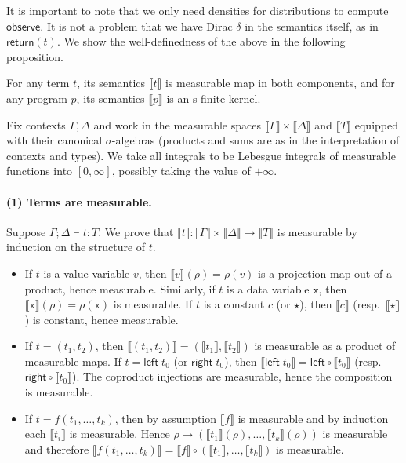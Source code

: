 \documentclass[preprint]{uai2026} %
\newcommand{\sem}[1]{\llbracket #1 \rrbracket}
\newcommand{\return}[1]{\mathsf{return}(#1)}
\newcommand{\datavar}[1]{\mathtt{#1}}
\begin{document}
It is important to note that we only need densities for distributions to compute $\mathsf{observe}$. It is not a problem that we have Dirac $\delta$ in the semantics itself, as in $\return{t}$.
We show the well-definedness of the above in the following proposition.
\begin{propositionE}\label{prop:semantics-well-defined}
    For any term $t$, its semantics $\sem{t}$ is measurable map in both components, and for any program $p$, its semantics $\sem{p}$ is an s-finite kernel.
\end{propositionE}
\begin{proofE}
Fix contexts $\Gamma,\Delta$ and work in the measurable spaces
$\sem{\Gamma}\times \sem{\Delta}$ and $\sem{T}$ equipped with their canonical $\sigma$-algebras (products and sums are as in the
interpretation of contexts and types). We take all integrals to be Lebesgue integrals of measurable functions into $[0,\infty]$, possibly taking the value of $+\infty$.

\paragraph{(1) Terms are measurable.}
Suppose $\Gamma;\Delta \vdash t:T$. We prove that $\sem{t}:\sem{\Gamma}\times\sem{\Delta}\to \sem{T}$ is measurable by
induction on the structure of $t$.

\begin{itemize}
\item If $t$ is a value variable $v$, then $\sem{v}(\rho)=\rho(v)$ is a projection map out of a product, hence measurable.
Similarly, if $t$ is a data variable $\datavar{x}$, then $\sem{\datavar{x}}(\rho)=\rho(\datavar{x})$ is measurable.
If $t$ is a constant $c$ (or $\star$), then $\sem{c}$ (resp.\ $\sem{\star}$) is constant, hence measurable.

\item If $t=(t_1,t_2)$, then $\sem{(t_1,t_2)}=(\sem{t_1},\sem{t_2})$ is measurable as a product of measurable maps.
If $t=\mathsf{left}\;t_0$ (or $\mathsf{right}\;t_0$), then $\sem{\mathsf{left}\;t_0}=\mathsf{left}\circ \sem{t_0}$
(resp.\ $\mathsf{right}\circ\sem{t_0}$). The coproduct injections are measurable, hence the composition is measurable.

\item If $t=f(t_1,\ldots,t_k)$, then by assumption $\sem{f}$ is measurable and by induction each $\sem{t_i}$ is measurable.
Hence $\rho\mapsto (\sem{t_1}(\rho),\ldots,\sem{t_k}(\rho))$ is measurable and therefore
$\sem{f(t_1,\ldots,t_k)}=\sem{f}\circ(\sem{t_1},\ldots,\sem{t_k})$ is measurable.


\end{itemize}
\end{proofE}
\end{document}
